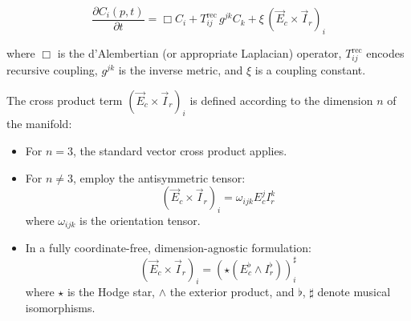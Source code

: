 \begin{equation}
\frac{\partial C_i(p,t)}{\partial t} = \Box C_i + T_{ij}^{\mathrm{rec}}\, g^{jk} C_k + \xi\, (\vec{E}_c \times \vec{I}_r)_i
\end{equation}

where \(\Box\) is the d'Alembertian (or appropriate Laplacian) operator, \(T_{ij}^{\mathrm{rec}}\) encodes recursive coupling, \(g^{jk}\) is the inverse metric, and \(\xi\) is a coupling constant.

The cross product term \((\vec{E}_c \times \vec{I}_r)_i\) is defined according to the dimension \(n\) of the manifold:
\begin{itemize}
    \item For \(n=3\), the standard vector cross product applies.
    \item For \(n \neq 3\), employ the antisymmetric tensor:
    \begin{equation}
    (\vec{E}_c \times \vec{I}_r)_i = \omega_{ijk} E_c^j I_r^k
    \end{equation}
    where \(\omega_{ijk}\) is the orientation tensor.
    \item In a fully coordinate-free, dimension-agnostic formulation:
    \begin{equation}
    (\vec{E}_c \times \vec{I}_r)_i = \left(\star(E_c^\flat \wedge I_r^\flat)\right)^\sharp_i
    \end{equation}
    where \(\star\) is the Hodge star, \(\wedge\) the exterior product, and \(\flat\), \(\sharp\) denote musical isomorphisms.
\end{itemize} 